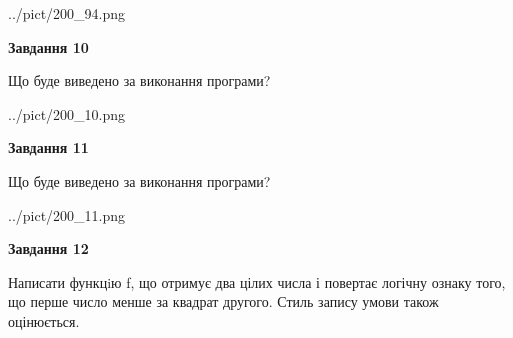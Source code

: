 \documentclass[12pt, ukrainian]{article}
\begin{document}
{\begin {large}
\begin{center}
	{../pict/200_94.png}
\end{center}
\newpage

{\begin {center}\textbf{Завдання 10}\end {center}}

Що буде виведено за виконання програми?\par
\begin{center}
	{../pict/200_10.png}
\end{center}
\newpage

{\begin {center}\textbf{Завдання 11}\end {center}}

Що буде виведено за виконання програми?\par
\begin{center}
	{../pict/200_11.png}
\end{center}
\newpage

{\begin {center}\textbf{Завдання 12}\end {center}}


Написати функцiю f, що отримує два цілих числа і повертає логічну ознаку того, що перше число менше за квадрат другого. Стиль запису умови також оцінюється.\par
\newpage

\end {large}}
\end{document}
